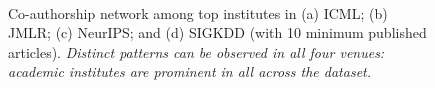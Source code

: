 \begin{figure}[!htbp]
	\centering
	\\
	\caption{Co-authorship network among top institutes in (a) ICML; (b) JMLR; (c) NeurIPS; and (d) SIGKDD (with 10 minimum published articles). \textit{Distinct patterns can be observed in all four venues: academic institutes are prominent in all across the dataset.}}
	\label{fig:inst_top_gephi}
\end{figure}


